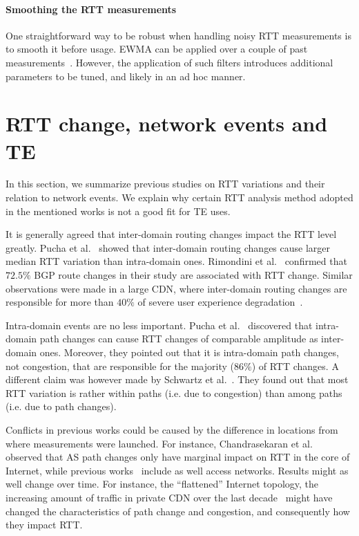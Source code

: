 \paragraph{Smoothing the RTT measurements} One straightforward way to be robust when handling noisy RTT measurements is to smooth it before usage. 
\ac{EWMA} can be applied over a couple of past measurements~\cite{Akella2008}. However, the application of such filters introduces additional parameters to be tuned, and likely in an ad hoc manner. 


\section{RTT change, network events and TE}
\label{sec:rtt_path}
In this section, we summarize previous studies on RTT variations and their relation to network events.
We explain why certain RTT analysis method adopted in the mentioned works is not a good fit for TE uses.

It is generally agreed that inter-domain routing changes impact the RTT level greatly.
Pucha et al.~\cite{Pucha2007} showed that inter-domain routing changes cause larger median RTT variation than intra-domain ones.
Rimondini et al.~\cite{Rimondini2014} confirmed that $72.5\%$ BGP route changes in their study are associated with RTT change.
Similar observations were made in a large \ac{CDN}, where inter-domain routing changes are responsible for more than $40\%$ of severe user experience degradation~\cite{Zhu2012}.

Intra-domain events are no less important. Pucha et al.~\cite{Pucha2007} discovered that intra-domain path changes can cause RTT changes of comparable amplitude as inter-domain ones.
Moreover, they pointed out that it is intra-domain path changes, not congestion, that are responsible for the majority ($86\%$) of RTT changes. %
A different claim was however made by Schwartz et al.~\cite{Schwartz2010}. They found out that most RTT variation is rather within paths (i.e. due to congestion) than among paths (i.e. due to path changes).

Conflicts in previous works could be caused by the difference in locations from where measurements were launched.
For instance, Chandrasekaran et al.~\cite{Chandrasekaran} observed that AS path changes only have marginal impact on RTT in the core of Internet, while previous works~\cite{Pucha2007, Schwartz2010} include as well access networks.
Results might as well change over time. For instance, the ``flattened'' Internet topology, the increasing amount of traffic in private CDN over the last decade~\cite{Labovitz2011, Roughan2011} might have changed the characteristics of path change and congestion, and consequently how they impact RTT.

